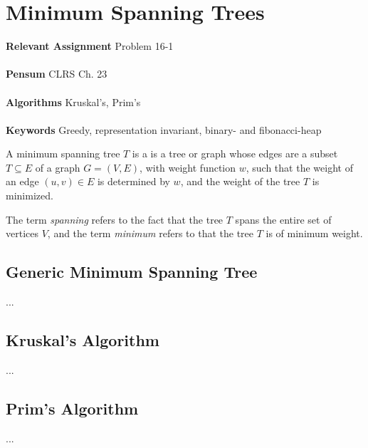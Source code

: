 
\chapter{Minimum Spanning Trees}
\label{ch:minimumspanningtrees}

\textbf{Relevant Assignment} Problem 16-1\\\\
\textbf{Pensum} CLRS Ch. 23\\\\
\textbf{Algorithms} Kruskal's, Prim's\\\\
\textbf{Keywords} Greedy, representation invariant, binary- and fibonacci-heap
\vspace{1in}

\noindent A minimum spanning tree $T$ is a is a tree or graph whose edges are
a subset $T \subseteq E$ of a graph $G = (V, E)$, with weight function $w$,
such that the weight of an edge $(u, v) \in E$ is determined by $w$, and the
weight of the tree $T$ is minimized.

The term \textit{spanning} refers to the fact that the tree $T$ spans the
entire set of vertices $V$, and the term \textit{minimum} refers to that the
tree $T$ is of minimum weight.

\newpage
\section{Generic Minimum Spanning Tree}
...



\section{Kruskal's Algorithm}
...


\section{Prim's Algorithm}
...

